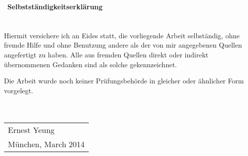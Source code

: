 \documentclass[a4paper,titlepage,twoside]{book}
\begin{document}
\begin{thebibliography}{9}

\end{thebibliography}




\newpage
\thispagestyle{empty}
$ \, $
\newpage
\textbf{\Large{Selbstst\"{a}ndigkeitserkl\"{a}rung}}
\\
\\
\\
\thispagestyle{empty}
Hiermit versichere ich an Eides statt, die vorliegende Arbeit selbst\"{a}ndig, ohne fremde Hilfe und ohne Benutzung andere als der von mir angegebenen Quellen angefertigt zu haben. Alle aus fremden Quellen direkt oder indirekt \"{u}bernommenen Gedanken sind als solche gekennzeichnet. 

Die Arbeit wurde noch keiner Pr\"{u}fungsbeh\"{o}rde in gleicher oder \"{a}hnlicher Form vorgelegt.  \\\\\\


\begin{tabular}{@{}l@{}}\hline
Ernest Yeung\\
M\"{u}nchen, March 2014
\end{tabular}
\end{document}
